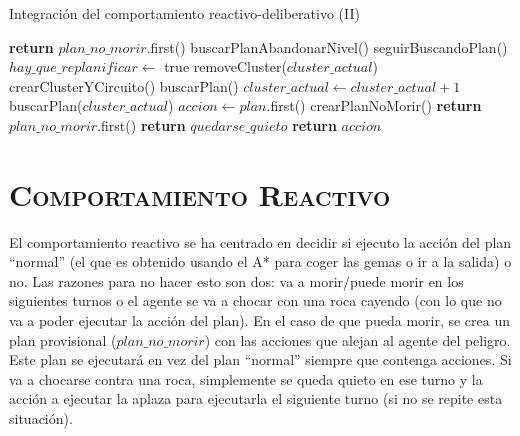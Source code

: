\documentclass[11pt,a4paper]{article}
\begin{document}
\begin{algorithm}[H]
\caption{Integración del comportamiento reactivo-deliberativo (II)}
\begin{algorithmic}[1]
\EndIf
\State {}
	\State \textbf{return} $plan\_no\_morir$.first()
\EndIf
{} 
	\State buscarPlanAbandonarNivel()
\EndIf
{} 
	\State seguirBuscandoPlan()
\EndIf
{}
	\State $hay\_que\_replanificar \gets $ true
		\State removeCluster($cluster\_actual$) 
		\State crearClusterYCircuito() 
	\EndIf
\EndIf
{}
	\State buscarPlan()
\EndIf
{}
		\State $cluster\_actual \gets cluster\_actual + 1$
		\State buscarPlan($cluster\_actual$)
	\Else
		\State $accion \gets plan$.first()
	\EndIf
\EndIf
\State {}
	\State crearPlanNoMorir()
	\State \textbf{return} $plan\_no\_morir$.first()
\EndIf
{}
	\State \textbf{return} $quedarse\_quieto$
\EndIf
\State \textbf{return} $accion$
\EndProcedure
\end{algorithmic}
\end{algorithm}

\section{\textsc{Comportamiento Reactivo}}

El comportamiento reactivo se ha centrado en decidir si ejecuto la acción del plan ``normal'' (el que es
obtenido usando el A* para coger las gemas o ir a la salida) o no. Las razones para no hacer esto son
dos: va a morir/puede morir en los siguientes turnos o el agente se va a chocar con una roca cayendo (con
lo que no va a poder ejecutar la acción del plan). En el caso de que pueda morir, se crea un plan
provisional ($plan\_no\_morir$) con las acciones que alejan al agente del peligro. Este plan se ejecutará
en vez del plan ``normal'' siempre que contenga acciones. Si va a chocarse contra una roca, simplemente
se queda quieto en ese turno y la acción a ejecutar la aplaza para ejecutarla el siguiente turno (si no
se repite esta situación).
\end{document}
